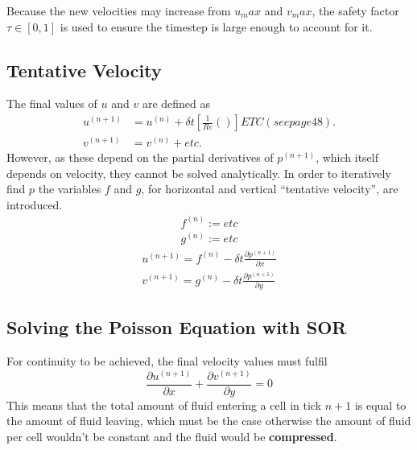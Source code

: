 Because the new velocities may increase from $u_max$ and $v_max$, the safety factor $\tau \in [0, 1]$ is used to ensure the timestep is large enough to account for it.

\subsection{Tentative Velocity}
The final values of $u$ and $v$ are defined as 
\begin{equation}
\begin{aligned}
    u^{(n+1)} &= u^{(n)} + \delta{t}\left[\frac{1}{Re}\left(\right)\right] ETC (see page 48). \\
    v^{(n+1)} &= v^{(n)} + etc.
\end{aligned}
\end{equation}
However, as these depend on the partial derivatives of $p^{(n+1)}$, which itself depends on velocity, they cannot be solved analytically.
In order to iteratively find $p$ the variables $f$ and $g$, for horizontal and vertical ``tentative velocity'', are introduced.
\begin{equation}
\begin{aligned}
    f^{(n)} := etc \\
    g^{(n)} := etc
\end{aligned}
\end{equation}
\begin{equation}
\begin{aligned}
    u^{(n+1)} = f^{(n)} - \delta{t}\frac{\partial{p^{(n+1)}}}{\partial{x}} \\
    v^{(n+1)} = g^{(n)} - \delta{t}\frac{\partial{p^{(n+1)}}}{\partial{y}}
    \label{eq:uv_modified}
\end{aligned}
\end{equation}

\subsection{Solving the Poisson Equation with SOR}
For continuity to be achieved, the final velocity values must fulfil
\begin{equation}
    \frac{\partial{u^{(n+1)}}}{\partial{x}} + \frac{\partial{v^{(n+1)}}}{\partial{y}} = 0
\end{equation}
This means that the total amount of fluid entering a cell in tick $n+1$ is equal to the amount of fluid leaving, which must be the case otherwise the amount of fluid per cell wouldn't be constant and the fluid would be \textbf{compressed}.

